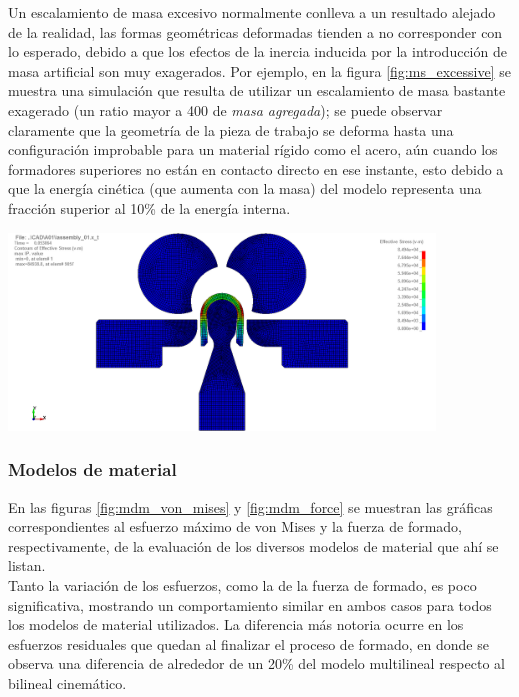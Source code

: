 Un escalamiento de masa excesivo normalmente conlleva a un resultado alejado de la realidad, las formas 
geométricas deformadas tienden a no corresponder con lo esperado, debido a que los efectos de la inercia 
inducida por la introducción de masa artificial son muy exagerados. Por ejemplo, en la figura 
\ref{fig:ms_excessive} se muestra una simulación que resulta de utilizar un escalamiento de masa bastante 
exagerado (un ratio mayor a 400 de \textit{masa agregada}); se puede observar claramente que la geometría 
de la pieza de trabajo se deforma hasta una configuración improbable para un material rígido como el acero, 
aún cuando los formadores superiores no están en contacto directo en ese instante, esto debido a que la 
energía cinética (que aumenta con la masa) del modelo representa una fracción superior al 10\% de la 
energía interna.\\

\begin{center}
\includegraphics[width=0.85\textwidth]{src/ch4/ms_excessive.png}
\label{fig:ms_excessive}
\end{center}

\subsubsection{Modelos de material}

En las figuras  \ref{fig:mdm_von_mises} y \ref{fig:mdm_force} se muestran las gráficas correspondientes 
al esfuerzo máximo de von Mises y la fuerza de formado, respectivamente, de la evaluación de los diversos 
modelos de material que ahí se listan.\\

Tanto la variación de los esfuerzos, como la de la fuerza de formado, es poco significativa, mostrando 
un comportamiento similar en ambos casos para todos los modelos de material utilizados. La 
diferencia más notoria ocurre en los esfuerzos residuales que quedan al finalizar el proceso 
de formado, en donde se observa una diferencia de alrededor de un 20\% del modelo multilineal 
respecto al bilineal cinemático.

